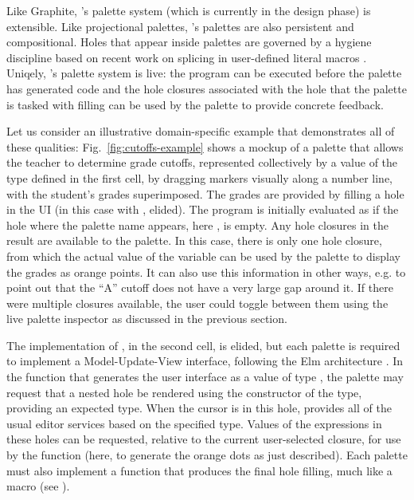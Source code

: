 Like Graphite, \Hazel's palette system (which is currently in the design phase) is extensible. 
Like projectional palettes, \Hazel's palettes are also persistent and compositional. 
Holes that appear inside palettes
are governed by a hygiene discipline based on recent work on splicing in user-defined literal macros
\cite{tlms-icfp18}. 
Uniqely, \Hazel's palette system is live: the program 
can be executed before the palette has generated code
and the hole closures associated with the hole that the 
palette is tasked with filling can be used by the palette
to provide concrete feedback.

Let us consider an illustrative domain-specific example that demonstrates
all of these qualities: 
Fig.~\ref{fig:cutoffs-example} shows a mockup of a palette that allows the teacher to determine grade cutoffs, represented collectively by a value of the type  defined in the first cell, by dragging markers visually along a number line, with the student's grades superimposed. The grades are provided by filling a hole in the UI (in this case with , elided). 
The program is initially evaluated as if the hole where the palette name appears, here , is empty. 
Any hole closures in the result are available to the palette. In this case, there is only one hole closure, from which the
actual value of the variable  can be 
used by the palette to display the grades as orange points.
It can also use this information in other ways, e.g. to point
out that the ``A'' cutoff does not have a very large gap around
it. If there were multiple closures available, the user could
toggle between them using the live palette inspector as discussed in the previous section.

%
The implementation of , in the second cell, is elided, but each palette is required to implement a
Model-Update-View interface, following the Elm architecture \cite{ElmArchitecture}. 
In the  function that generates the user
interface as a value of type , the palette may request that a nested hole be
rendered using the  constructor of the  type, providing an expected type. When the cursor is in this hole, \Hazel provides all of the usual editor services based on the specified type. Values of the expressions in these holes 
can be requested, relative to the current user-selected closure, for use by the  function (here, to generate the orange dots as just described). 
Each palette must
also implement a  function that produces the final
hole filling, much like a macro (see \cite{tlms-icfp18}).
